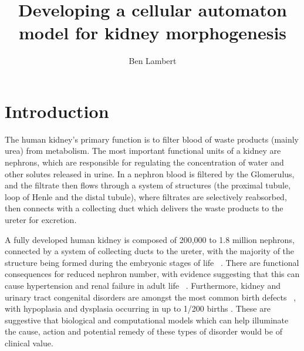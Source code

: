 \documentclass[pdftex,10pt,a4paper,twocolumn]{article}
\title{\textbf{Developing a cellular automaton model for kidney morphogenesis}}
\author{Ben Lambert}
\begin{document}

\section{Introduction}
The human kidney's primary function is to filter blood of waste products (mainly urea) from metabolism. The most important functional units of a kidney are nephrons, which are responsible for regulating the concentration of water and other solutes released in urine. In a nephron blood is filtered by the Glomerulus, and the filtrate then flows through a system of structures (the proximal tubule, loop of Henle and the distal tubule), where filtrates are selectively reabsorbed, then connects with a collecting duct which delivers the waste products to the ureter for excretion.

A fully developed human kidney is composed of 200,000 to 1.8 million nephrons, connected by a system of collecting ducts to the ureter, with the majority of the structure being formed during the embryonic stages of life ~\cite{hughson2003glomerular}. There are functional consequences for reduced nephron number, with evidence suggesting that this can cause hypertension and renal failure in adult life ~\cite{hoy2008nephron}. Furthermore, kidney and urinary tract congenital disorders are amongst the most common birth defects ~\cite{airik2007down}, with hypoplasia and dysplasia occurring in up to 1/200 births \cite{weber2006prevalence}. These are suggestive that biological and computational models which can help illuminate the cause, action and potential remedy of these types of disorder would be of clinical value.
\end{document}
